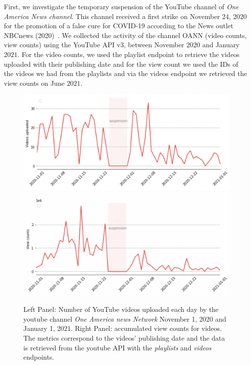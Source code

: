 \documentclass{article}
\begin{document}
\smallskip

First, we investigate the temporary suspension of the YouTube channel of {\it One America News channel}. This channel received a first strike on November 24, 2020 for the promotion of  a false cure for COVID-19 according to the News outlet NBCnews (2020)~\cite{nbcnews}. We collected the activity of the channel OANN (video counts, view counts) using  the YouTube API v3, between November $2020$ and January $2021$. For the video counts, we used the playlist endpoint to retrieve the videos uploaded with their publishing date and for the view count we used the IDs of the videos we had from the playlists and via the videos endpoint we retrieved the view counts on June $2021$.%

\begin{figure}[h]
	\centering
		\includegraphics[scale=0.27]{./img/oann/fig1_oann.png}
		\includegraphics[scale=0.26]{./img/oann/fig2_oann.png} 
	\caption{Left Panel: Number of YouTube videos uploaded each day by the youtube channel {\it One America news Network} November 1, 2020 and January 1, 2021. Right Panel: accumulated view counts for videos. The metrics correspond to the videos’  publishing date and the data is retrieved from the youtube API with the {\it playlists} and  {\it videos} endpoints. }
	\label{fig1_oann}
\end{figure}
\end{document}
